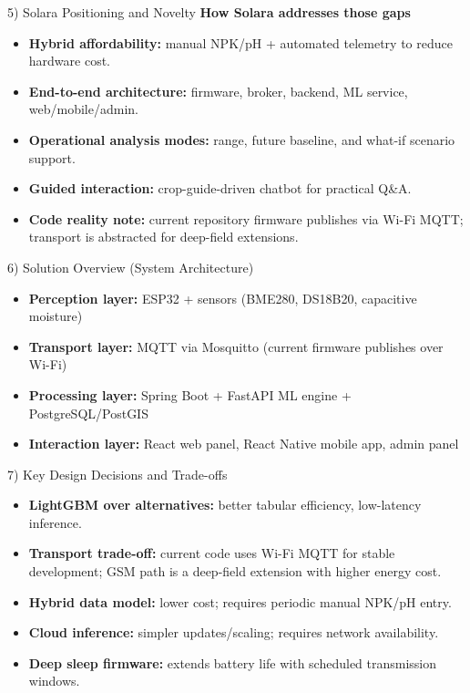 \documentclass[aspectratio=169]{beamer}
\begin{document}
\begin{frame}{5) Solara Positioning and Novelty}
  \textbf{How Solara addresses those gaps}
  \begin{itemize}
    \item \textbf{Hybrid affordability:} manual NPK/pH + automated telemetry to reduce hardware cost.
    \item \textbf{End-to-end architecture:} firmware, broker, backend, ML service, web/mobile/admin.
    \item \textbf{Operational analysis modes:} range, future baseline, and what-if scenario support.
    \item \textbf{Guided interaction:} crop-guide-driven chatbot for practical Q\&A.
    \item \textbf{Code reality note:} current repository firmware publishes via Wi-Fi MQTT; transport is abstracted for deep-field extensions.
  \end{itemize}
\end{frame}

\begin{frame}{6) Solution Overview (System Architecture)}
  \begin{itemize}
    \item \textbf{Perception layer:} ESP32 + sensors (BME280, DS18B20, capacitive moisture)
    \item \textbf{Transport layer:} MQTT via Mosquitto (current firmware publishes over Wi-Fi)
    \item \textbf{Processing layer:} Spring Boot + FastAPI ML engine + PostgreSQL/PostGIS
    \item \textbf{Interaction layer:} React web panel, React Native mobile app, admin panel
  \end{itemize}
  \vspace{0.5em}
  \centering
\end{frame}

\begin{frame}{7) Key Design Decisions and Trade-offs}
  \begin{itemize}
    \item \textbf{LightGBM over alternatives:} better tabular efficiency, low-latency inference.
    \item \textbf{Transport trade-off:} current code uses Wi-Fi MQTT for stable development; GSM path is a deep-field extension with higher energy cost.
    \item \textbf{Hybrid data model:} lower cost; requires periodic manual NPK/pH entry.
    \item \textbf{Cloud inference:} simpler updates/scaling; requires network availability.
    \item \textbf{Deep sleep firmware:} extends battery life with scheduled transmission windows.
  \end{itemize}
\end{frame}
\end{document}
